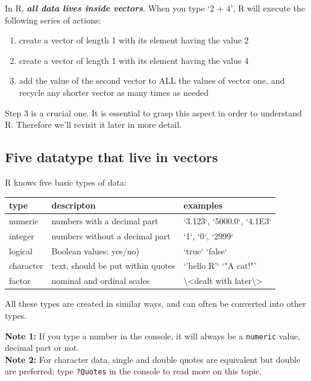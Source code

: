 \documentclass[]{book}
\providecommand{\tightlist}{%
  \setlength{\itemsep}{0pt}\setlength{\parskip}{0pt}}
\begin{document}
In R, \emph{\textbf{all data lives inside vectors}}. When you type `2 + 4', R will execute the following series of actions:

\begin{enumerate}
\def\labelenumi{\arabic{enumi}.}
\tightlist
\item
  create a vector of length 1 with its element having the value 2
\item
  create a vector of length 1 with its element having the value 4
\item
  add the value of the second vector to ALL the values of vector one, and recycle any shorter vector as many times as needed
\end{enumerate}

Step 3 is a crucial one. It is essential to grasp this aspect in order to understand R. Therefore we'll revisit it later in more detail.

\hypertarget{five-datatype-that-live-in-vectors}{%
\subsection{Five datatype that live in vectors}\label{five-datatype-that-live-in-vectors}}

R knows five basic types of data:

\begin{tabular}{l|l|l}
\hline
type & descripton & examples\\
\hline
numeric & numbers with a decimal part & `3.123`, `5000.0`, `4.1E3`\\
\hline
integer & numbers without a decimal part & `1`, `0`, `2999`\\
\hline
logical & Boolean values: yes/no) & `true` `false`\\
\hline
character & text, should be put within quotes & `'hello R'` `"A cat!"`\\
\hline
factor & nominal and ordinal scales & \textbackslash{}<dealt with later\textbackslash{}>\\
\hline
\end{tabular}

All these types are created in similar ways, and can often be converted into other types.

\textbf{Note 1:} If you type a number in the console, it will always be a \texttt{numeric} value, decimal part or not.\\
\textbf{Note 2:} For character data, single and double quotes are equivalent but double are preferred; type \texttt{?Quotes} in the console to read more on this topic.
\end{document}
